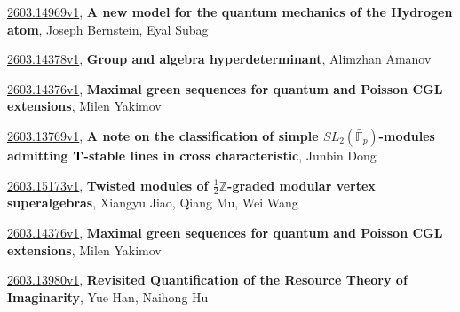 \documentclass[9pt, a4paper]{article}
\theoremstyle{plain}
\theoremstyle{definition}
\theoremstyle{remark}
\newcommand{\arxiv}[3]{\href{https://arxiv.org/abs/#1}{#1}, \textbf{\textcolor{arxivblue}{#2}}, #3}
\begin{document}
\arxiv{2603.14969v1}{A new model for the quantum mechanics of the Hydrogen atom}{Joseph Bernstein, Eyal Subag}

\arxiv{2603.14378v1}{Group and algebra hyperdeterminant}{Alimzhan Amanov}

\arxiv{2603.14376v1}{Maximal green sequences for quantum and Poisson CGL extensions}{Milen Yakimov}

\arxiv{2603.13769v1}{A note on the classification of simple $SL_2(\bar{\mathbb{F}}_p)$-modules admitting $\bf T$-stable lines in cross characteristic}{Junbin Dong}

\arxiv{2603.15173v1}{Twisted modules of $\frac{1}{2}\mathbb{Z}$-graded modular vertex superalgebras}{Xiangyu Jiao, Qiang Mu, Wei Wang}

\arxiv{2603.14376v1}{Maximal green sequences for quantum and Poisson CGL extensions}{Milen Yakimov}

\arxiv{2603.13980v1}{Revisited Quantification of the Resource Theory of Imaginarity}{Yue Han, Naihong Hu}

\end{document}
